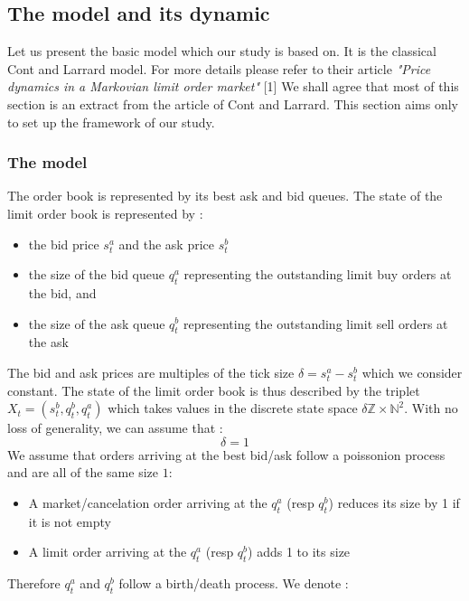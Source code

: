 \documentclass{article}
\begin{document}
\subsection{The model and its dynamic}
Let us present the basic model which our study is based on. It is the classical Cont and Larrard model. For more details please refer to their article \textit{"Price dynamics in a Markovian limit order market"} [1]
\newline
We shall agree that most of this section is an extract from the article of Cont and Larrard. This section aims only to set up the framework of our study.
\subsubsection{The model}
The order book is represented by its best ask and bid queues. The state of the limit order book is represented by :
\begin{itemize}
\item the bid price $ s_{t}^{a} $ and the ask price $ s_{t}^{b} $ 
\item the size of the bid queue $ q_{t}^{a} $ representing the outstanding limit buy orders at the bid, and 
\item the size of the ask queue $ q_{t}^{b} $ representing the outstanding limit sell orders at the ask 
\end{itemize}
The bid and ask prices are multiples of the tick size $\delta = s_{t}^{a} - s_{t}^{b}$ which we consider constant.
The state of the limit order book is thus described by the triplet $X_{t} = (s_{t}^{b}, q_{t}^{b}, q_{t}^{a})$ which takes values in the discrete state space $\delta \mathbb{Z} \times \mathbb{N}^{2} $. With no loss of generality, we can assume that  :
\begin{equation}
\delta = 1
\end{equation}
We assume that orders arriving at the best bid/ask follow a poissonion process and are all of the same size $1$:
\begin{itemize}
	\item A market/cancelation order arriving at the $q_t^a$ (resp $q_t^b$) reduces its size by 1 if it is not empty
	\item A limit order arriving at the $q_t^a$ (resp $q_t^b$) adds 1 to its size 
\end{itemize}
Therefore $q_t^a$ and $q_t^b$ follow a birth/death process.
We denote :
\end{document}
